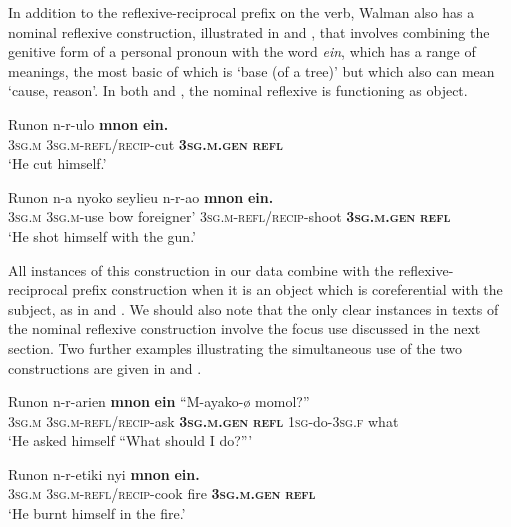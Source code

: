 \documentclass[output=paper]{langscibook}
\begin{document}
  In addition to the reflexive-reciprocal prefix on the verb, Walman also has a nominal reflexive construction, illustrated in  and , that involves combining the genitive form of a personal pronoun with the word \emph{ein}, which has a range of meanings, the most basic of which is ‘base (of a tree)’ but which also can mean ‘cause, reason’. In both  and , the nominal reflexive is functioning as object.


\ea%
    \label{ex:Brown:44}
    \gll Runon  n-r-ulo  \textbf{mnon}  \textbf{ein.} \\
 \textsc{3sg.m}  \textsc{3sg.m}{}-\textsc{refl/recip}{}-cut  \textbf{\textsc{3sg.m.gen}}  \textbf{\textsc{refl}}\\
    \glt ‘He cut himself.’
    \z
 

\ea%
    \label{ex:Brown:45}
    \gll  Runon  n-a  nyoko  seylieu  n-r-ao \textbf{mnon}  \textbf{ein.} \\
 \textsc{3sg.m}  \textsc{3sg.m}{}-use  bow  foreigner’  \textsc{3sg.m-refl/recip}{}-shoot \textbf{\textsc{3sg.m.gen}}  \textbf{\textsc{refl}}\\
    \glt ‘He shot himself with the gun.’
    \z


All instances of this construction in our data combine with the reflexive-reciprocal prefix construction when it is an object which is coreferential with the subject, as in  and . We should also note that the only clear instances in texts of the nominal reflexive construction involve the focus use discussed in the next section. Two further examples illustrating the simultaneous use of the two constructions are given in  and .

\ea%
    \label{ex:Brown:46}
    \gll   Runon  n-r-arien  \textbf{mnon}  \textbf{ein}  “M-ayako-ø  momol?”\\
 \textsc{3sg.m}  \textsc{3sg.m}{}-\textsc{refl/recip}{}-ask  \textbf{\textsc{3sg.m.gen}}  \textbf{\textsc{refl}}  \textsc{1sg}{}-do-\textsc{3sg.f}  what\\
    \glt  ‘He asked himself “What should I do?”’
    \z


\ea%
    \label{ex:Brown:47}
    \gll Runon  n-r-etiki  nyi  \textbf{mnon}  \textbf{ein.}\\
 \textsc{3sg.m}  \textsc{3sg.m-refl/recip}{}-cook  fire  \textbf{\textsc{3sg.m.gen}}  \textbf{\textsc{refl}}\\
    \glt ‘He burnt himself in the fire.’
    \z
\end{document}
